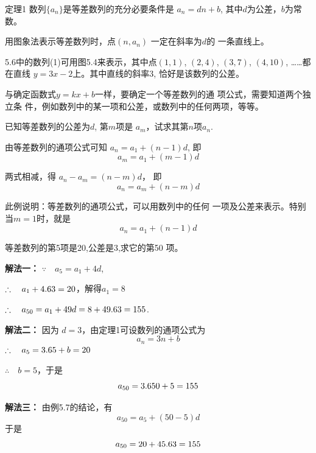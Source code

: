 \begin{thm}
{定理1} 数列$\{a_n\}$是等差数列的充分必要条件是
$a_n=dn+b$, 其中$d$为公差，$b$为常数。
\end{thm}

用图象法表示等差数列时，点$(n,a_n)$
一定在斜率为$d$的
一条直线上。

5.6中的数列(1)可用图5.4来表示，其中点$(1,1)$,
$(2,4)$, $(3,7)$, $(4,10)$, ……都在直线
$y=3x-2$上。其中直线的斜率3, 恰好是该数列的公差。

\begin{figure}[htp]
    \centering
{}
    \caption{}
\end{figure}


与确定函数式$y=kx+b$一样，要确定一个等差数列的通
项公式，需要知道两个独立条
件，例如数列中的某一项和公差，或数列中的任何两项，等等。

\begin{example}
   已知等差数列的公差为$d$, 第$m$项是
$a_m$，试求其第$n$项$a_n$. 
\end{example}

\begin{solution}
    由等差数列的通项公式可知
$a_n=a_1+(n-1)d$, 
即
\[a_m=a_1+(m-1)d\]

两式相减，得
$a_n-a_m=(n-m)d$，
即
\[a_n=a_m+(n-m)d\]
\end{solution}

此例说明：等差数列的通项公式，可以用数列中的任何
一项及公差来表示。特别当$m=1$时，就是
\[a_n=a_1+(n-1)d\]

\begin{example}
    等差数列的第5项是20,公差是3,求它的第50
项。
\end{example}

\begin{solution}
 \textbf{解法一：} $\because\quad a_5=a_1+4d$,

$\therefore\quad a_1+4.63=20$，解得$a_1=8$

$\therefore\quad a_{50}=a_1+49d=8+49.63=155$.

\textbf{解法二：} 因为
$d=3$，由定理1可设数列的通项公式为
\[a_n=3n+b\]
$\therefore\quad a_5=3.65+b=20$

$\therefore\quad b=5$，于是
\[a_{50}=3.650+5=155\]

\textbf{解法三：} 由例5.7的结论，有
\[a_{50}=a_5+(50-5)d\]
于是
\[a_{50}=20+45.63=155\]
\end{solution}

